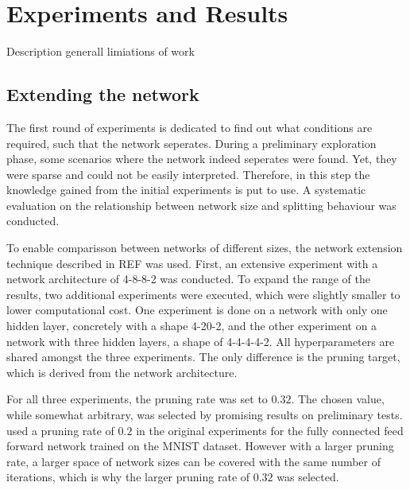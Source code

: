 \section{Experiments and Results}
Description generall
limiations of work

\subsection{Extending the network}
The first round of experiments is dedicated to find out what conditions are required, such that the network seperates.
During a preliminary exploration phase, some scenarios where the network indeed seperates were found.
Yet, they were sparse and could not be easily interpreted.
Therefore, in this step the knowledge gained from the initial experiments is put to use.
A systematic evaluation on the relationship between network size and splitting behaviour was conducted.

To enable comparisson between networks of different sizes, the network extension technique described in REF was used.
First, an extensive experiment with a network architecture of 4-8-8-2 was conducted.
To expand the range of the results, two additional experiments were executed, which were slightly smaller to lower computational cost.
One experiment is done on a network with only one hidden layer, concretely with a shape 4-20-2, and the other experiment on a network with three hidden layers, a shape of 4-4-4-4-2.
All hyperparameters are shared amongst the three experiments.
The only difference is the pruning target, which is derived from the network architecture.

For all three experiments, the pruning rate was set to $0.32$.
The chosen value, while somewhat arbitrary, was selected by promising results on preliminary tests.
\textcite{DBLP:conf/iclr/FrankleC19} used a pruning rate of $0.2$ in the original experiments for the fully connected feed forward network trained on the MNIST dataset.
However with a larger pruning rate, a larger space of network sizes can be covered with the same number of iterations, which is why the larger pruning rate of $0.32$ was selected.

